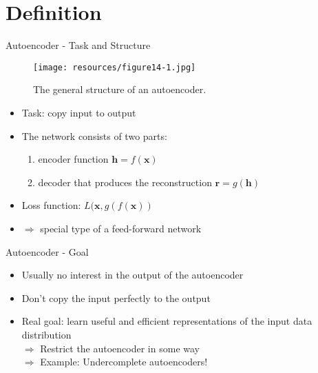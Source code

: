 \documentclass[handout]{beamer}
\begin{document}
\section{Definition}
\begin{frame}[t]{Autoencoder - Task and Structure}
    \begin{figure}[h]
        \centering
        \texttt{[image: resources/figure14-1.jpg]} 
        \caption{The general structure of an autoencoder.}
    \end{figure}
\begin{itemize}
    \pause
    \item Task: copy input to output
    \pause
    \item The network consists of two parts: 
        \begin{enumerate}
            \pause
            \item encoder function $\pmb{h} = f(\pmb{x})$
            \pause
            \item decoder that produces the reconstruction $\pmb{r} = g(\pmb{h})$
        \end{enumerate}
            \pause
        \item Loss function: $L(\pmb{x}, g(f(\pmb{x}))$
    \pause
            \item $\Rightarrow$ special type of a feed-forward network\\ 
\end{itemize}
\end{frame}


\begin{frame}[t]{Autoencoder - Goal}
   \begin{itemize}
       \pause
       \item Usually no interest in the output of the autoencoder
           \pause
       \item Don't copy the input perfectly to the output
           \pause
       \item Real goal: learn useful and efficient representations of the input data distribution\\
            \pause
            $\Rightarrow$ Restrict the autoencoder in some way\\
            \pause
            $\Rightarrow$ Example: Undercomplete autoencoders!
   \end{itemize} 
\end{frame}
\end{document}
